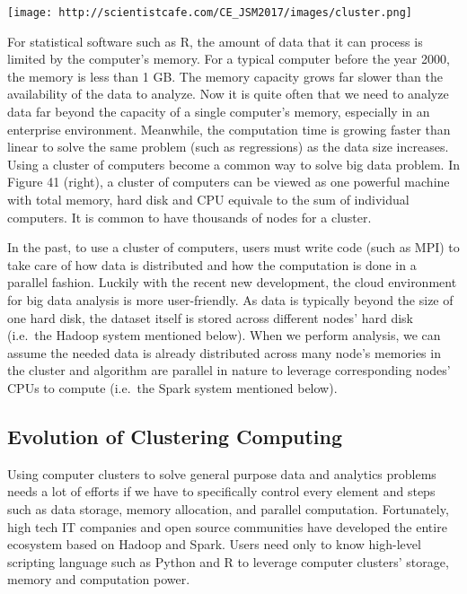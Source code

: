 \documentclass[
]{article}
\begin{document}
\texttt{[image: http://scientistcafe.com/CE\_JSM2017/images/cluster.png]}

For statistical software such as R, the amount of data that it can
process is limited by the computer's memory. For a typical computer
before the year 2000, the memory is less than 1 GB. The memory capacity
grows far slower than the availability of the data to analyze. Now it is
quite often that we need to analyze data far beyond the capacity of a
single computer's memory, especially in an enterprise environment.
Meanwhile, the computation time is growing faster than linear to solve
the same problem (such as regressions) as the data size increases. Using
a cluster of computers become a common way to solve big data problem. In
Figure 41 (right), a cluster of computers can be viewed as one powerful
machine with total memory, hard disk and CPU equivale to the sum of
individual computers. It is common to have thousands of nodes for a
cluster.

In the past, to use a cluster of computers, users must write code (such
as MPI) to take care of how data is distributed and how the computation
is done in a parallel fashion. Luckily with the recent new development,
the cloud environment for big data analysis is more user-friendly. As
data is typically beyond the size of one hard disk, the dataset itself
is stored across different nodes' hard disk (i.e.~the Hadoop system
mentioned below). When we perform analysis, we can assume the needed
data is already distributed across many node's memories in the cluster
and algorithm are parallel in nature to leverage corresponding nodes'
CPUs to compute (i.e.~the Spark system mentioned below).

\hypertarget{evolution-of-clustering-computing}{%
\subsection{Evolution of Clustering
Computing}\label{evolution-of-clustering-computing}}

Using computer clusters to solve general purpose data and analytics
problems needs a lot of efforts if we have to specifically control every
element and steps such as data storage, memory allocation, and parallel
computation. Fortunately, high tech IT companies and open source
communities have developed the entire ecosystem based on Hadoop and
Spark. Users need only to know high-level scripting language such as
Python and R to leverage computer clusters' storage, memory and
computation power.
\end{document}
